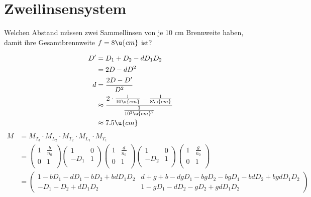 \documentclass[ex]{exercise}
\begin{document}
\section{Zweilinsensystem}
Welchen Abstand müssen zwei Sammellinsen von je 10 cm Brennweite haben, damit ihre 
Gesamtbrennweite \(f=8 \u{cm}\) ist?

\dottedline

\begin{align*}
    D' &= D_1 + D_2 - d D_1 D_2\\
    &= 2 D - d D^2\\
    d &=\frac{2D - D'}{D^2}\\
    &\approx \frac{2\cdot \frac 1{10\u{cm}} - \frac1{8\u{cm}}}{\frac1{10^2\u{cm}^2}}\\
    &\approx 7.5\u{cm}
\end{align*}
\begin{align*}   
    M &= M_{T_3}\cdot M_{L_2}\cdot M_{T_2}\cdot M_{L_1}\cdot M_{T_1}\\
    &= \begin{pmatrix}
        1&\frac{b}{n_0}\\
        0&1\\
    \end{pmatrix}
    \begin{pmatrix}
        1&0\\
        -D_1&1\\
    \end{pmatrix}
    \begin{pmatrix}
        1&\frac{d}{n_0}\\
        0&1\\
    \end{pmatrix}
    \begin{pmatrix}
        1&0\\
        -D_2&1\\
    \end{pmatrix}
    \begin{pmatrix}
        1&\frac{g}{n_0}\\
        0&1\\
    \end{pmatrix}\\
    &= \begin{pmatrix}
        1- b D_1 - d D_1 - b D_2 + b d D_1 D_2 & 
        d+g+b- d g D_1 - b g D_2 - b g D_1 - b d D_2 + b g d D_1 D_2\\
        -D_1 - D_2 + d D_1 D_2 &
        1- g D_1 - d D_2 - g D_2 + g d D_1 D_2
    \end{pmatrix}\\

\end{align*}
\end{document}
